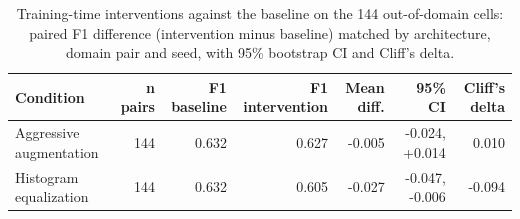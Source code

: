 \begin{table}[htbp]
\centering
\caption{Training-time interventions against the baseline on the 144 out-of-domain cells: paired F1 difference (intervention minus baseline) matched by architecture, domain pair and seed, with 95\% bootstrap CI and Cliff's delta.}
\label{tab:intervenciones}
\begin{tabular}{lrrrrrr}
\toprule
Condition & n pairs & F1 baseline & F1 intervention & Mean diff. & 95\% CI & Cliff's delta \\
\midrule
Aggressive augmentation & 144 & 0.632 & 0.627 & -0.005 & -0.024, +0.014 & 0.010 \\
Histogram equalization & 144 & 0.632 & 0.605 & -0.027 & -0.047, -0.006 & -0.094 \\
\bottomrule
\end{tabular}
\end{table}
